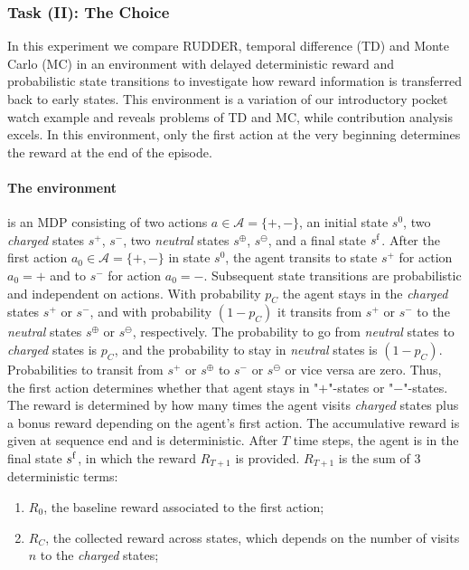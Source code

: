 \documentclass{article}
\newcommand{\cA}{\mathcal{A}} \newcommand{\cB}{\mathcal{B}}
\begin{document}
\begin{appendices}
\subsubsection{Task (II): The Choice}
\label{c:thechoice}
In this experiment we compare RUDDER, temporal difference (TD) and Monte Carlo (MC) in 
an environment with delayed deterministic reward 
and probabilistic state transitions to investigate how reward information
is transferred back to early states.
This environment is a variation of our introductory
pocket watch example and reveals problems of TD and MC,
while contribution analysis excels. 
In this environment, only the first action at the very beginning 
determines the reward at the end of the episode.

\paragraph{ The environment} is an MDP consisting of two actions $a \in \cA = \{+,- \}$,
an initial state $s^{0}$, two {\em charged} states $s^+$, $s^-$, 
two {\em neutral} states $s^{\oplus}$, $s^{\ominus}$, and a final state $s^{\mathrm{f}}$.
After the first action $a_0 \in \cA = \{+,- \}$ in state $s^{0}$,
the agent transits to state $s^+$ for action $a_0 =+$ and to $s^-$ for 
action $a_0=-$. 
Subsequent state transitions are probabilistic and independent on actions. 
With probability $p_C$ the agent stays in the {\em charged} states $s^+$ or $s^-$,
and with probability $(1-p_C)$ it transits from $s^+$ or $s^-$
to the {\em neutral} states $s^{\oplus}$ or $s^{\ominus}$, respectively. 
The probability to go from {\em neutral} states 
to {\em charged} states is $p_C$, 
and the probability to stay in {\em neutral} states is $(1-p_C)$. 
Probabilities to transit from 
$s^+$ or $s^{\oplus}$ to $s^-$ or $s^{\ominus}$ or vice versa are zero.
Thus, the first action determines whether that agent stays in "$+$"-states or 
"$-$"-states.
The reward is determined by how many times the agent visits {\em charged} states 
plus a bonus reward depending on the agent's first action.
The accumulative reward is given at sequence end and is deterministic.
After $T$ time steps, the agent is in the final state $s^{\mathrm{f}}$, 
in which the reward $R_{T+1}$ is provided.
 $R_{T+1}$ is the sum of 3 deterministic terms: 
 \begin{enumerate}
     \item $R_0$, the baseline reward associated to the first action; 
     \item $R_C$, the collected reward across states, 
     which depends on the number of visits $n$ to the {\em charged} states;

\end{enumerate}
\end{appendices}
\end{document}
